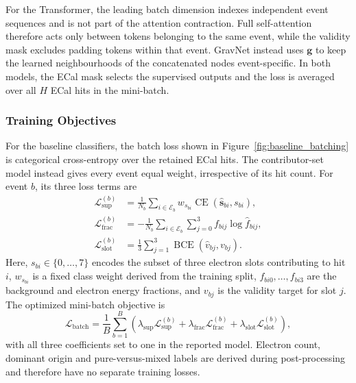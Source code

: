 For the Transformer, the leading batch dimension indexes independent event
sequences and is not part of the attention contraction. Full self-attention
therefore acts only between tokens belonging to the same event, while the
validity mask excludes padding tokens within that event. GravNet instead uses
\(\mathbf{g}\) to keep the learned neighbourhoods of the concatenated nodes
event-specific. In both models, the ECal mask selects the supervised outputs
and the loss is averaged over all \(H\) ECal hits in the mini-batch.

\subsubsection{Training Objectives}
\label{sec:method_training}

For the baseline classifiers, the batch loss shown in
Figure~\ref{fig:baseline_batching} is categorical cross-entropy over the
retained ECal hits. The contributor-set model instead gives every event equal
weight, irrespective of its hit count. For event \(b\), its three loss terms
are
\begin{align}
    \mathcal{L}_{\mathrm{sup}}^{(b)}
    &=
    \frac{1}{N_b}\sum_{i\in\mathcal{E}_b}
    w_{s_{bi}}\operatorname{CE}
    \!\left(\widehat{\boldsymbol{s}}_{bi},s_{bi}\right), \\
    \mathcal{L}_{\mathrm{frac}}^{(b)}
    &=
    -\frac{1}{N_b}\sum_{i\in\mathcal{E}_b}
    \sum_{j=0}^{3} f_{bij}\log \widehat f_{bij}, \\
    \mathcal{L}_{\mathrm{slot}}^{(b)}
    &=
    \frac{1}{3}\sum_{j=1}^{3}
    \operatorname{BCE}\!\left(\widehat v_{bj},v_{bj}\right).
\end{align}
Here, \(s_{bi}\in\{0,\ldots,7\}\) encodes the subset of three electron slots
contributing to hit \(i\), \(w_{s_{bi}}\) is a fixed class weight derived from
the training split, \(f_{bi0},\ldots,f_{bi3}\) are the background and
electron energy fractions, and \(v_{bj}\) is the validity target for slot
\(j\). The optimized mini-batch objective is
\begin{equation}
    \mathcal{L}_{\mathrm{batch}}
    =
    \frac{1}{B}\sum_{b=1}^{B}
    \left(
    \lambda_{\mathrm{sup}}\mathcal{L}_{\mathrm{sup}}^{(b)}
    +\lambda_{\mathrm{frac}}\mathcal{L}_{\mathrm{frac}}^{(b)}
    +\lambda_{\mathrm{slot}}\mathcal{L}_{\mathrm{slot}}^{(b)}
    \right),
\end{equation}
with all three coefficients set to one in the reported model. Electron count,
dominant origin and pure-versus-mixed labels are derived during
post-processing and therefore have no separate training losses.


